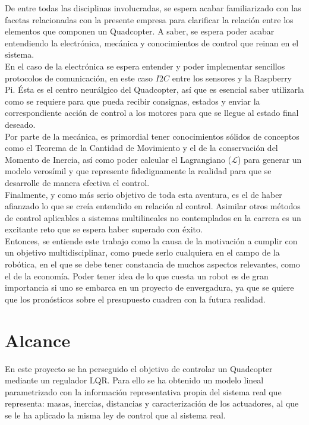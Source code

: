 \documentclass[twoside,11pt]{book}
\begin{document}
De entre todas las disciplinas involucradas, se espera acabar familiarizado con las facetas relacionadas con la presente empresa para clarificar la relación entre los elementos que componen un Quadcopter.  A saber, se espera poder acabar entendiendo la electrónica, mecánica y conocimientos de control que reinan en el sistema. \\

En el caso de la electrónica se espera entender y poder implementar sencillos protocolos de comunicación, en este caso $I2C$ entre los sensores y la Raspberry Pi. Ésta es el centro neurálgico del Quadcopter, así que es esencial saber utilizarla como se requiere para que pueda recibir consignas, estados y enviar la correspondiente acción de control a los motores para que se llegue al estado final deseado. \\

Por parte de la mecánica, es primordial tener conocimientos sólidos de conceptos como el Teorema de la Cantidad de Movimiento y el de la conservación del Momento de Inercia, así como poder calcular el Lagrangiano ($\mathcal{L}$) para generar un modelo verosímil y que represente fidedignamente la realidad para que se desarrolle de manera efectiva el control. \\

Finalmente, y como más serio objetivo de toda esta aventura, es el de haber afianzado lo que se creía entendido en relación al control. Asimilar otros métodos de control aplicables a sistemas multilineales no contemplados en la carrera es un excitante reto que se espera haber superado con éxito. \\

Entonces, se entiende este trabajo como la causa de la motivación a cumplir con un objetivo multidisciplinar, como puede serlo cualquiera en el campo de la robótica, en el que se debe tener constancia de muchos aspectos relevantes, como el de la economía. Poder tener idea de lo que cuesta un robot es de gran importancia si uno se embarca en un proyecto de envergadura, ya que se quiere que los pronósticos sobre el presupuesto cuadren con la futura realidad. 
\section{Alcance}

En este proyecto se ha perseguido el objetivo de controlar un Quadcopter mediante un regulador LQR. Para ello se ha obtenido un modelo lineal parametrizado con la información representativa propia del sistema real que representa: masas, inercias, distancias y caracterización de los actuadores, al que se le ha aplicado la misma ley de control que al sistema real. \\
\end{document}
